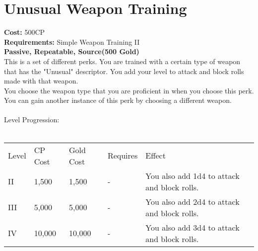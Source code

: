 \section{Unusual Weapon Training}
\textbf{Cost:} 500CP\\
\textbf{Requirements:} Simple Weapon Training II\\
\textbf{Passive, Repeatable, Source(500 Gold)}\\
This is a set of different perks. You are trained with a certain type of weapon that has the "Unusual" descriptor. You add your level to attack and block rolls made with that weapon.\\
You choose the weapon type that you are proficient in when you choose this perk. You can gain another instance of this perk by choosing a different weapon.\\
\\
Level Progression:\\
\\
\begin{tabular}{l | l | l | l | l}
	Level & CP Cost & Gold Cost & Requires & Effect\\
	II & 1,500 & 1,500 & - & You also add 1d4 to attack and block rolls.\\
	III & 5,000 & 5,000 & - & You also add 2d4 to attack and block rolls.\\
	IV & 10,000 & 10,000 & - & You also add 3d4 to attack and block rolls.\\
\end{tabular}